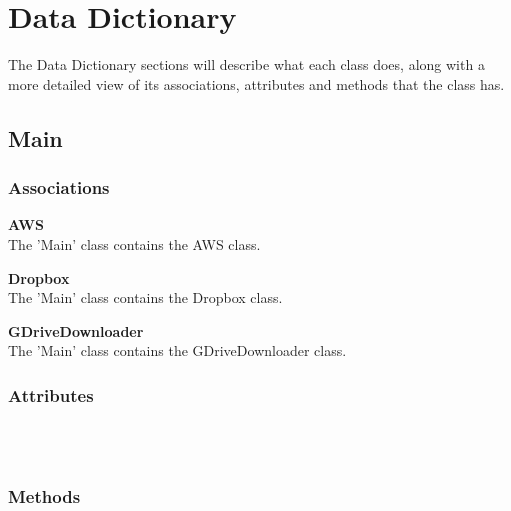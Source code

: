 \section{Data Dictionary}
The Data Dictionary sections will describe what each class does, along with a more detailed view of its
associations, attributes and methods that the class has.

\subsection{Main}

\subsubsection{Associations}
\textbf{AWS} \\
The 'Main' class contains the AWS class.

\textbf{Dropbox} \\
The 'Main' class contains the Dropbox class.

\textbf{GDriveDownloader} \\
The 'Main' class contains the GDriveDownloader class.

\subsubsection{Attributes}
\textbf{} \\

\textbf{} \\

\subsubsection{Methods}
\textbf{} \\
  
\textbf{} \\

